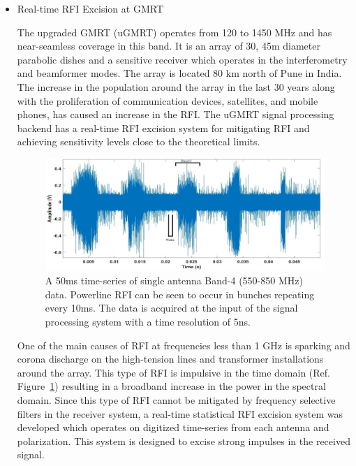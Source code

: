 \begin{itemize}
\item Real-time RFI Excision at GMRT

The upgraded GMRT (uGMRT) \citep{gupta2017upgraded} operates from 120 to 1450 MHz and has near-seamless coverage in this band. It is an array of 30, 45m diameter parabolic dishes and a sensitive receiver which operates in the interferometry and beamformer modes. The array is located 80 km north of Pune in India. The increase in the population around the array in the last 30 years along with the proliferation of communication devices, satellites, and mobile phones, has caused an increase in the RFI. The uGMRT signal processing backend has a real-time RFI excision system for mitigating RFI and achieving sensitivity levels close to the theoretical limits. \\

\begin{figure}
    \centering
    \includegraphics[scale=0.7]{Hardware Excision Techniques/figures/Band4_timeseries_ed.jpg}
    \caption{A 50ms time-series of single antenna Band-4 (550-850 MHz) data. Powerline RFI can be seen to occur in bunches repeating every 10ms. The data is acquired at the input of the signal processing system with a time resolution of 5ns.}
    \label{fig:ugmrt-b4-ts}
\end{figure}

One of the main causes of RFI at frequencies less than 1 GHz is sparking and corona discharge on the high-tension lines and transformer installations around the array. This type of RFI is impulsive in the time domain (Ref. Figure~\ref{fig:ugmrt-b4-ts}) resulting in a broadband increase in the power in the spectral domain. Since this type of RFI cannot be mitigated by frequency selective filters in the receiver system, a real-time statistical RFI excision system was developed which operates on digitized time-series from each antenna and polarization. This system is designed to excise strong impulses in the received signal. \\


\end{itemize}
